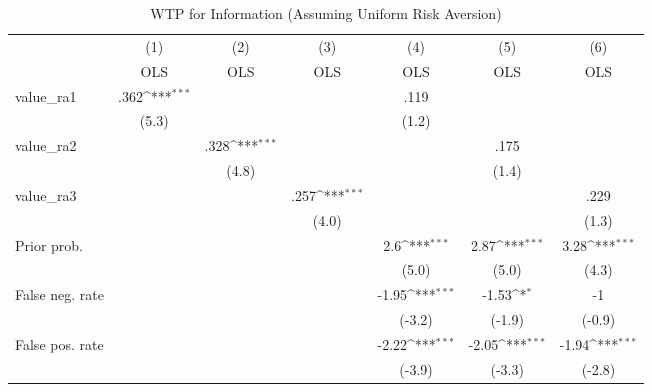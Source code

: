 \begin{table}[htbp]\centering
\def\sym#1{\ifmmode^{#1}\else\(^{#1}\)\fi}
\caption{WTP for Information (Assuming Uniform Risk Aversion)}
\begin{tabular}{l*{6}{c}}
\hline\hline
                &\multicolumn{1}{c}{(1)}&\multicolumn{1}{c}{(2)}&\multicolumn{1}{c}{(3)}&\multicolumn{1}{c}{(4)}&\multicolumn{1}{c}{(5)}&\multicolumn{1}{c}{(6)}\\
                &\multicolumn{1}{c}{OLS}&\multicolumn{1}{c}{OLS}&\multicolumn{1}{c}{OLS}&\multicolumn{1}{c}{OLS}&\multicolumn{1}{c}{OLS}&\multicolumn{1}{c}{OLS}\\
\hline
value\_ra1       &     .362\sym{***}&                  &                  &     .119         &                  &                  \\
                &    (5.3)         &                  &                  &    (1.2)         &                  &                  \\
value\_ra2       &                  &     .328\sym{***}&                  &                  &     .175         &                  \\
                &                  &    (4.8)         &                  &                  &    (1.4)         &                  \\
value\_ra3       &                  &                  &     .257\sym{***}&                  &                  &     .229         \\
                &                  &                  &    (4.0)         &                  &                  &    (1.3)         \\
Prior prob.     &                  &                  &                  &      2.6\sym{***}&     2.87\sym{***}&     3.28\sym{***}\\
                &                  &                  &                  &    (5.0)         &    (5.0)         &    (4.3)         \\
False neg. rate &                  &                  &                  &    -1.95\sym{***}&    -1.53\sym{*}  &       -1         \\
                &                  &                  &                  &   (-3.2)         &   (-1.9)         &   (-0.9)         \\
False pos. rate &                  &                  &                  &    -2.22\sym{***}&    -2.05\sym{***}&    -1.94\sym{***}\\
                &                  &                  &                  &   (-3.9)         &   (-3.3)         &   (-2.8)         \\

\end{tabular}
\end{table}
